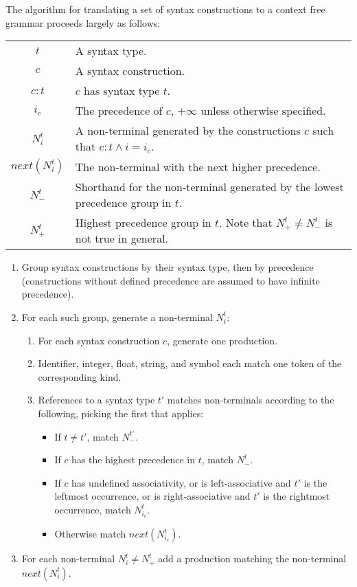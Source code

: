 \documentclass{kththesis}
\begin{document}
The algorithm for translating a set of syntax constructions to a context free grammar proceeds largely as follows:

\begin{tabular}{c|p{10cm}}
$t$ & A syntax type. \\
$c$ & A syntax construction. \\
$c:t$ & $c$ has syntax type $t$. \\
$i_c$ & The precedence of $c$, $+\infty$ unless otherwise specified. \\
$N^t_i$ & A non-terminal generated by the constructions $c$ such that $c:t \land i = i_c$. \\
$next(N^t_i)$ & The non-terminal with the next higher precedence. \\
$N^t_-$ & Shorthand for the non-terminal generated by the lowest precedence group in $t$. \\
$N^t_+$ & Highest precedence group in $t$. Note that $N^t_+ \neq N^t_-$ is not true in general. \\
\end{tabular}

\begin{enumerate}
  \item Group syntax constructions by their syntax type, then by precedence (constructions without defined precedence are assumed to have infinite precedence).
  \item For each such group, generate a non-terminal $N^t_i$:
  \begin{enumerate}
    \item For each syntax construction $c$, generate one production.
    \item Identifier, integer, float, string, and symbol each match one token of the corresponding kind.
    \item References to a syntax type $t'$ matches non-terminals according to the following, picking the first that applies:
    \begin{itemize}
      \item If $t \neq t'$, match $N^{t'}_-$.
      \item If $c$ has the highest precedence in $t$, match $N^t_-$.
      \item If $c$ has undefined associativity, or is left-associative and $t'$ is the leftmost occurrence, or is right-associative and $t'$ is the rightmost occurrence, match $N^t_{i_c}$.
      \item Otherwise match $next(N^t_{i_c})$.
    \end{itemize}
  \end{enumerate}
  \item For each non-terminal $N^t_i \neq N^t_+$ add a production matching the non-terminal $next(N^t_i)$.
\end{enumerate}
\end{document}
